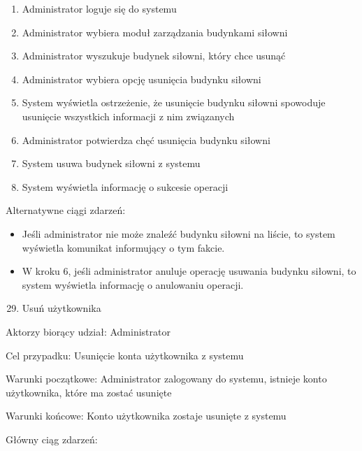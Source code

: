 \documentclass[
]{article}
\providecommand{\tightlist}{%
  \setlength{\itemsep}{0pt}\setlength{\parskip}{0pt}}
\begin{document}
\begin{enumerate}
\tightlist
\item
  {Administrator loguje się do systemu}
\item
  {Administrator wybiera moduł zarządzania budynkami siłowni}
\item
  {Administrator wyszukuje budynek siłowni, który chce usunąć}
\item
  {Administrator wybiera opcję usunięcia budynku siłowni}
\item
  {System wyświetla ostrzeżenie, że usunięcie budynku siłowni spowoduje
  usunięcie wszystkich informacji z nim związanych}
\item
  {Administrator potwierdza chęć usunięcia budynku siłowni}
\item
  {System usuwa budynek siłowni z systemu}
\item
  {System wyświetla informację o sukcesie operacji}
\end{enumerate}

{Alternatywne ciągi zdarzeń:}

\begin{itemize}
\tightlist
\item
  {Jeśli administrator nie może znaleźć budynku siłowni na liście, to
  system wyświetla komunikat informujący o tym fakcie. }
\item
  {W kroku 6, jeśli administrator anuluje operację usuwania budynku
  siłowni, to system wyświetla informację o anulowaniu operacji.}
\end{itemize}

{}

\begin{enumerate}
\setcounter{enumi}{28}
\tightlist
\item
  {Usuń użytkownika}
\end{enumerate}

{Aktorzy biorący udział: Administrator}

{Cel przypadku: Usunięcie konta użytkownika z systemu}

{Warunki początkowe: Administrator zalogowany do systemu, istnieje konto
użytkownika, które ma zostać usunięte}

{Warunki końcowe: Konto użytkownika zostaje usunięte z systemu}

{Główny ciąg zdarzeń:}
\end{document}
